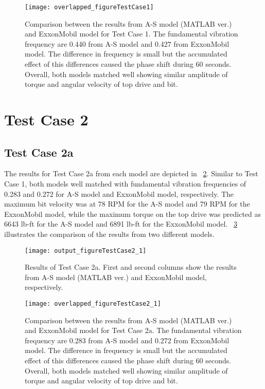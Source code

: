 \begin{figure}
  \centering
  \texttt{[image: overlapped\_figureTestCase1]}
  \caption[Comparison of the results for Test Case 1]{Comparison between the results from A-S model (MATLAB ver.) and ExxonMobil model for Test Case 1. The fundamental vibration frequency are 0.440 from A-S model and 0.427 from ExxonMobil model. The difference in frequency is small but the accumulated effect of this differences caused the phase shift during 60 seconds. Overall, both models matched well showing similar amplitude of torque and angular velocity of top drive and bit. }\label{figure_testcase1_overlapped}
\end{figure}

\section{Test Case 2}
\subsection{Test Case 2a}
The results for Test Case 2a from each model are depicted in \figurename~\ref{figure_testcase2_1}. Similar to Test Case 1, both models well matched with fundamental vibration frequencies of 0.283 and 0.272 for A-S model and ExxonMobil model, respectively. The maximum bit velocity was at 78 RPM for the A-S model and 79 RPM for the ExxonMobil model, while the maximum torque on the top drive was predicted as 6643 lb-ft for the A-S model and 6891 lb-ft for the ExxonMobil model. \figurename~\ref{figure_testcase2_1_overlapped} illustrates the comparison of the results from two different models. 
\begin{figure}
  \centering
  \texttt{[image: output\_figureTestCase2\_1]}
  \caption[Results of Test Case 2a]{Results of Test Case 2a. First and second columns show the results from A-S model (MATLAB ver.) and ExxonMobil model, respectively.}\label{figure_testcase2_1}
\end{figure}

\begin{figure}
  \centering
  \texttt{[image: overlapped\_figureTestCase2\_1]}
  \caption[Comparison of the results for Test Case 2a]{Comparison between the results from A-S model (MATLAB ver.) and ExxonMobil model for Test Case 2a. The fundamental vibration frequency are 0.283 from A-S model and 0.272 from ExxonMobil model. The difference in frequency is small but the accumulated effect of this differences caused the phase shift during 60 seconds. Overall, both models matched well showing similar amplitude of torque and angular velocity of top drive and bit.}\label{figure_testcase2_1_overlapped}
\end{figure}


